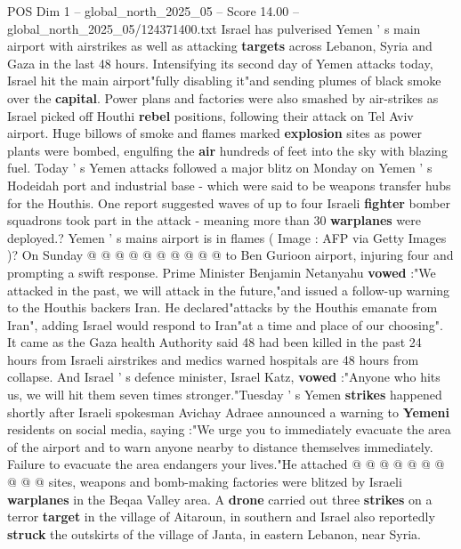 \begin{textsample}{POS Dim 1 – global\_north\_2025\_05 – Score 14.00 – global\_north\_2025\_05/124371400.txt}  \label{ex:f1_pos_376}
Israel has pulverised Yemen ' s main airport with airstrikes as well as attacking \textbf{targets} across Lebanon, Syria and Gaza in the last 48 hours.
Intensifying its second day of Yemen attacks today, Israel hit the main airport"fully disabling it"and sending plumes of black smoke over the \textbf{capital}.
Power plans and factories were also smashed by air-strikes as Israel picked off Houthi \textbf{rebel} positions, following their attack on Tel Aviv airport.
Huge billows of smoke and flames marked \textbf{explosion} sites as power plants were bombed, engulfing the \textbf{air} hundreds of feet into the sky with blazing fuel.
Today ' s Yemen attacks followed a major blitz on Monday on Yemen ' s Hodeidah port and industrial base - which were said to be weapons transfer hubs for the Houthis.
One report suggested waves of up to four Israeli \textbf{fighter} bomber squadrons took part in the attack - meaning more than 30 \textbf{warplanes} were deployed.?
Yemen ' s mains airport is in flames ( Image : AFP via Getty Images )?
On Sunday @ @ @ @ @ @ @ @ @ @ to Ben Gurioon airport, injuring four and prompting a swift response.
Prime Minister Benjamin Netanyahu \textbf{vowed} :"We attacked in the past, we will attack in the future,"and issued a follow-up warning to the Houthis backers Iran.
He declared"attacks by the Houthis emanate from Iran", adding Israel would respond to Iran"at a time and place of our choosing".
It came as the Gaza health Authority said 48 had been killed in the past 24 hours from Israeli airstrikes and medics warned hospitals are 48 hours from collapse.
And Israel ' s defence minister, Israel Katz, \textbf{vowed} :"Anyone who hits us, we will hit them seven times stronger."Tuesday ' s Yemen \textbf{strikes} happened shortly after Israeli spokesman Avichay Adraee announced a warning to \textbf{Yemeni} residents on social media, saying :"We urge you to immediately evacuate the area of the airport and to warn anyone nearby to distance themselves immediately.
Failure to evacuate the area endangers your lives."He attached @ @ @ @ @ @ @ @ @ @ sites, weapons and bomb-making factories were blitzed by Israeli \textbf{warplanes} in the Beqaa Valley area.
A \textbf{drone} carried out three \textbf{strikes} on a terror \textbf{target} in the village of Aitaroun, in southern and Israel also reportedly \textbf{struck} the outskirts of the village of Janta, in eastern Lebanon, near Syria.

\end{textsample}
